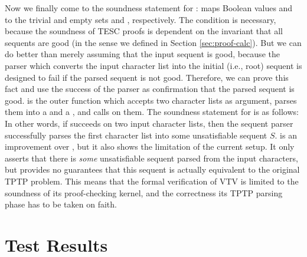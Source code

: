 \documentclass{lipics-v2021}
\begin{document}
Now we finally come to the soundness statement for :
 \AgdaSymbol{:}    
maps Boolean values  and  to
the trivial and empty sets  and , respectively.
The condition \AgdaSpace{} is necessary, because 
the soundness of TESC proofs is dependent on the invariant that all sequents are good
(in the sense we defined in Section \ref{sec:proof-calc}).
But we can do better than merely assuming that the input sequent is good,
because the parser which converts the input character list into the initial (i.e., root) 
sequent is designed to fail if the parsed sequent is not good. Therefore, we can prove 
this fact and use the success of the parser as confirmation that the parsed sequent is good.
 is the outer function which accepts two character lists as argument, 
parses them into a  and a , and calls 
on them. The soundness statement for  is as follows:
In other words, if  succeeds on two input character lists, 
then the sequent parser successfully parses the first character list into some unsatisfiable 
sequent $S$.  is an improvement over ,
but it also shows the limitation of the current setup. It only asserts that there is 
\textit{some} unsatisfiable sequent parsed from the input characters, 
but provides no guarantees that this sequent is actually equivalent to the original
TPTP problem. This means that the formal verification of VTV is limited to the soundness 
of its proof-checking kernel, and the correctness its TPTP parsing phase has to be 
taken on faith.

\section{Test Results} \label{sec:test-results}
\end{document}
